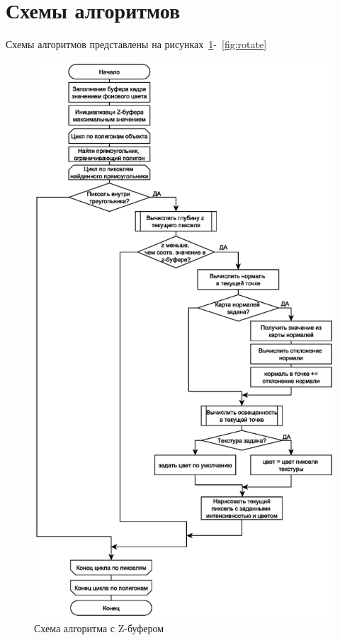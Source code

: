 \section{Схемы алгоритмов}
Схемы алгоритмов представлены на рисунках~\ref{fig:z_buffer}-~\ref{fig:rotate}
\begin{figure}[H]
	\centering
	\includegraphics[scale=0.6]{img/Z_buf.eps}
	\caption{Схема алгоритма с Z-буфером}
	\label{fig:z_buffer}
\end{figure}

